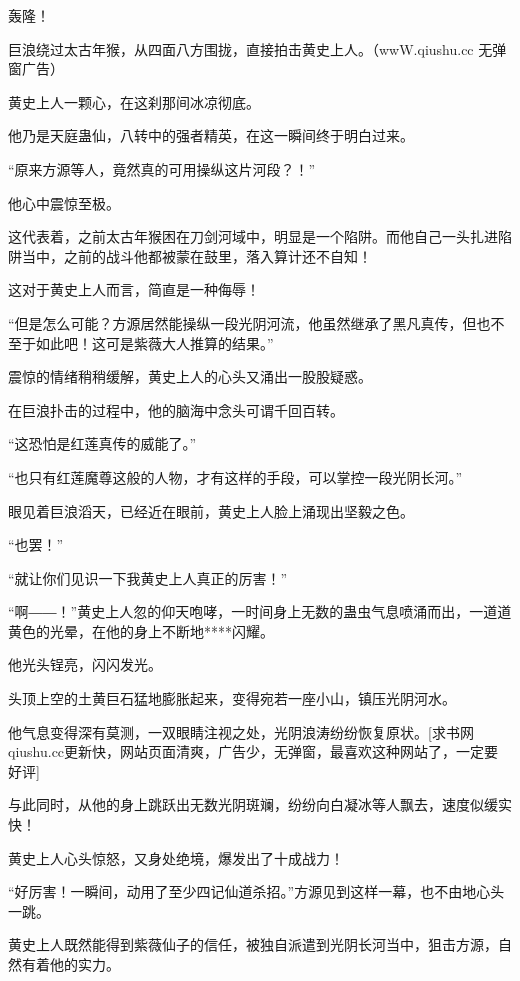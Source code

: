 
\begin{this_body}

轰隆！

巨浪绕过太古年猴，从四面八方围拢，直接拍击黄史上人。（wwW.qiushu.cc 无弹窗广告）

黄史上人一颗心，在这刹那间冰凉彻底。

他乃是天庭蛊仙，八转中的强者精英，在这一瞬间终于明白过来。

“原来方源等人，竟然真的可用操纵这片河段？！”

他心中震惊至极。

这代表着，之前太古年猴困在刀剑河域中，明显是一个陷阱。而他自己一头扎进陷阱当中，之前的战斗他都被蒙在鼓里，落入算计还不自知！

这对于黄史上人而言，简直是一种侮辱！

“但是怎么可能？方源居然能操纵一段光阴河流，他虽然继承了黑凡真传，但也不至于如此吧！这可是紫薇大人推算的结果。”

震惊的情绪稍稍缓解，黄史上人的心头又涌出一股股疑惑。

在巨浪扑击的过程中，他的脑海中念头可谓千回百转。

“这恐怕是红莲真传的威能了。”

“也只有红莲魔尊这般的人物，才有这样的手段，可以掌控一段光阴长河。”

眼见着巨浪滔天，已经近在眼前，黄史上人脸上涌现出坚毅之色。

“也罢！”

“就让你们见识一下我黄史上人真正的厉害！”

“啊――！”黄史上人忽的仰天咆哮，一时间身上无数的蛊虫气息喷涌而出，一道道黄色的光晕，在他的身上不断地****闪耀。

他光头锃亮，闪闪发光。

头顶上空的土黄巨石猛地膨胀起来，变得宛若一座小山，镇压光阴河水。

他气息变得深有莫测，一双眼睛注视之处，光阴浪涛纷纷恢复原状。[求书网qiushu.cc更新快，网站页面清爽，广告少，无弹窗，最喜欢这种网站了，一定要好评]

与此同时，从他的身上跳跃出无数光阴斑斓，纷纷向白凝冰等人飘去，速度似缓实快！

黄史上人心头惊怒，又身处绝境，爆发出了十成战力！

“好厉害！一瞬间，动用了至少四记仙道杀招。”方源见到这样一幕，也不由地心头一跳。

黄史上人既然能得到紫薇仙子的信任，被独自派遣到光阴长河当中，狙击方源，自然有着他的实力。


\end{this_body}
